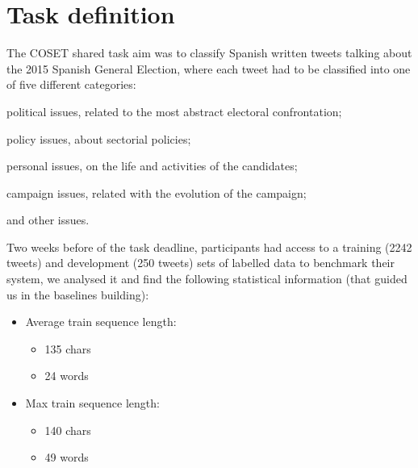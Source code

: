 \section{Task definition} \label{sec:task}

The COSET shared task aim was to classify Spanish written tweets talking about the 2015 Spanish General Election, where each tweet had to be classified into one of five different categories:
\begin{enumerate*}
\item political issues, related to the most abstract electoral confrontation; 
\item policy issues, about sectorial policies; 
\item personal issues, on the life and activities of the candidates; 
\item campaign issues, related with the evolution of the campaign;
\item and other issues.
\end{enumerate*}

Two weeks before of the task deadline, participants had access to a training (2242 tweets) and development (250 tweets) sets of labelled data to benchmark their system, we analysed it and find the following statistical information (that guided us in the baselines building):
\begin{multicols}{2}
\begin{itemize}
	\item Average train sequence length:
	\begin{itemize}
		\item 135 chars 
		\item 24 words
	\end{itemize}
	\item Max train sequence length: 
	\begin{itemize}
		\item 140 chars
		\item 49 words
	\end{itemize}
\end{itemize}
\end{multicols}